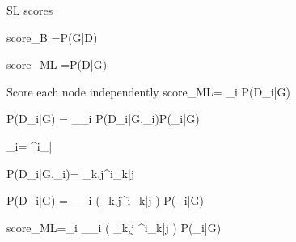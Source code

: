 SL scores

\beq
score_{B}
=P(G|D)
\eeq

\beq
score_{ML}
=P(D|G)
\eeq

Score each node
independently
\beq
score_{ML}=
\prod_i
P(D_i|G)
\eeq

\beq
P(D_i|G)
=
\sum_{\alp_i}
P(D_i|G,\alp_i)P(\alp_i|G)
\eeq

\beq
\alp_i= \alp^i_{\cdot|\cdot}
\eeq


\beq
P(D_i|G,\alp_i)=
\prod_{k,j}\hat{\pi}^i_{k|j}
\eeq

\beq
P(D_i|G)
=
\sum_{\alp_i}
\left(\prod_{k,j}\hat{\pi}^i_{k|j}
\right)
P(\alp_i|G)
\eeq

\beq
score_{ML}=\prod_i
\sum_{\alp_i}
\left(
\prod_{k,j}
\hat{\pi}^i_{k|j}
\right)
P(\alp_i|G)
\eeq


